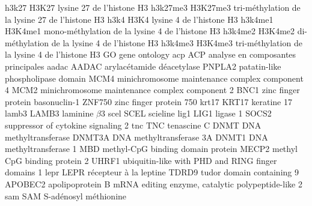 %
\newacronym
	{h3k27}
	{H3K27}
	{lysine 27 de l'histone H3}
\newacronym
	{h3k27me3}
	{H3K27me3}
	{tri-méthylation de la lysine 27 de l'histone H3}
\newacronym
	{h3k4}
	{H3K4}
	{lysine 4 de l'histone H3}
\newacronym
	{h3k4me1}
	{H3K4me1}
	{mono-méthylation de la lysine 4 de l'histone H3}
\newacronym
	{h3k4me2}
	{H3K4me2}
	{di-méthylation de la lysine 4 de l'histone H3}
\newacronym
	{h3k4me3}
	{H3K4me3}
	{tri-méthylation de la lysine 4 de l'histone H3}
%
	{GO}
	{gene ontology}
\newacronym
	{acp}
	{ACP}
	{analyse en composantes principales}
%
\newacronym
	{aadac}
	{AADAC}
	{arylacétamide déacetylase}
	{PNPLA2}
	{patatin-like phospholipase domain}
	{MCM4}
	{minichromosome maintenance complex component 4}
	{MCM2}
	{minichromosome maintenance complex component 2}
	{BNC1}
	{zinc finger protein basonuclin-1}
	{ZNF750}
	{zinc finger protein 750}
\newacronym
	{krt17}
	{KRT17}
	{keratine 17}
\newacronym
	{lamb3}
	{LAMB3}
	{laminine $\beta$3}
\newacronym
	{scel}
	{SCEL}
	{scieline}
\newacronym
	{lig1}
	{LIG1}
	{ligase 1}
	{SOCS2}
	{suppressor of cytokine signaling 2}
\newacronym
	{tnc}
	{TNC}
	{tenascine C}
	{DNMT}
	{DNA methyltransferase}
	{DNMT3A}
	{DNA methyltransferase 3A}
	{DNMT1}
	{DNA methyltransferase 1}
	{MBD}
	{methyl-CpG binding domain protein}
	{MECP2}
	{methyl CpG binding protein 2}
	{UHRF1}
	{ubiquitin-like with PHD and RING finger domains 1}
\newacronym
	{lepr}
	{LEPR}
	{récepteur à la leptine}
	{TDRD9}
	{tudor domain containing 9}
	{APOBEC2}
	{apolipoprotein B mRNA editing enzyme, catalytic polypeptide-like 2}
\newacronym
	{sam}
	{SAM}
	{S-adénosyl méthionine}